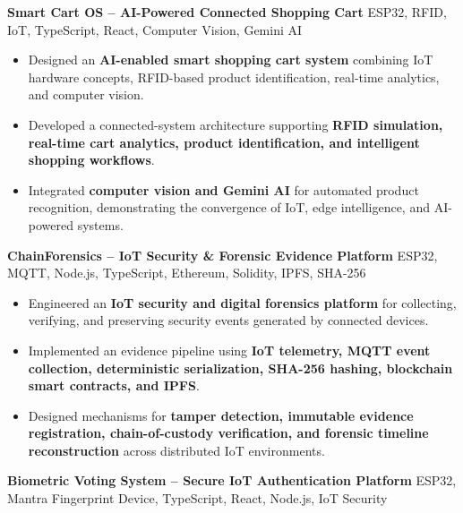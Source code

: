 \documentclass[a4paper,11pt]{article}
\newcommand{\resumeItem}[1]{
    \item \small{#1 \vspace{-2pt}}
}
\newcommand{\resumeProject}[2]{
    \vspace{2pt}
    \textbf{#1} \hfill {\small #2}
    \vspace{2pt}
}
\begin{document}
\vspace{1mm}

\resumeProject
{Smart Cart OS -- AI-Powered Connected Shopping Cart}
{ESP32, RFID, IoT, TypeScript, React, Computer Vision, Gemini AI}

\begin{itemize}[leftmargin=*]

\resumeItem{Designed an \textbf{AI-enabled smart shopping cart system} combining IoT hardware concepts, RFID-based product identification, real-time analytics, and computer vision.}

\resumeItem{Developed a connected-system architecture supporting \textbf{RFID simulation, real-time cart analytics, product identification, and intelligent shopping workflows}.}

\resumeItem{Integrated \textbf{computer vision and Gemini AI} for automated product recognition, demonstrating the convergence of IoT, edge intelligence, and AI-powered systems.}

\end{itemize}

\vspace{1mm}

\resumeProject
{ChainForensics -- IoT Security \& Forensic Evidence Platform}
{ESP32, MQTT, Node.js, TypeScript, Ethereum, Solidity, IPFS, SHA-256}

\begin{itemize}[leftmargin=*]

\resumeItem{Engineered an \textbf{IoT security and digital forensics platform} for collecting, verifying, and preserving security events generated by connected devices.}

\resumeItem{Implemented an evidence pipeline using \textbf{IoT telemetry, MQTT event collection, deterministic serialization, SHA-256 hashing, blockchain smart contracts, and IPFS}.}

\resumeItem{Designed mechanisms for \textbf{tamper detection, immutable evidence registration, chain-of-custody verification, and forensic timeline reconstruction} across distributed IoT environments.}

\end{itemize}

\vspace{1mm}

\resumeProject
{Biometric Voting System -- Secure IoT Authentication Platform}
{ESP32, Mantra Fingerprint Device, TypeScript, React, Node.js, IoT Security}
\end{document}
